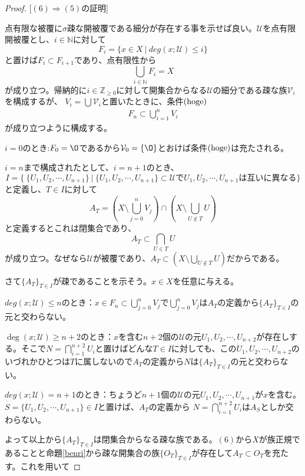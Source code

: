 \documentclass[leqno]{jsarticle}
\newcommand{\To}{\Longrightarrow}
\newcommand{\nn}{\mathbb{N}}
\newcommand{\zz}{\mathbb{Z}}
\newcommand{\dpst}{\displaystyle}
\begin{document}
\begin{proof}
\par[$(3)\To (1)$の証明終わり]\par
[$(6)\To (5)$の証明]\par
点有限な被覆に$\sigma$疎な開被覆である細分が存在する事を示せば良い。$\mathcal{U}$を点有限開被覆とし、$i\in \nn$に対して
\[
F_{i}=\{x\in X\ |\ deg(x;\mathcal{U})\le i\}
\]
と置けば$F_{i}\subset F_{i+1}$であり、点有限性から
\[
\bigcup_{i\in \nn}F_{i}=X
\]
が成り立つ。帰納的に$i\in \zz_{\ge 0}$に対して開集合からなる$\mathcal{U}$の細分である疎な族$\mathcal{V}_{i}$を構成するが、
$V_i=\bigcup\mathcal{V}_i$と置いたときに、条件$({\rm hoge})$
\begin{align}
F_{n}\subset \bigcup_{i=1}^nV_i\tag{hoge}
\end{align}
が成り立つように構成する。\par 
$i=0$のとき:$F_0=\O$であるから$\mathcal{V}_0=\{\O\}$とおけば条件$({\rm hoge})$は充たされる。\par
$i=n$まで構成されたとして、$i=n+1$のとき、
\[
I=\{\ \{U_{1},U_{2},\cdots,U_{n+1}\}\ |\ \mbox{$\{U_{1},U_{2},\cdots,U_{n+1}\}\subset \mathcal{U}$で$U_{1},U_{2},\cdots,U_{n+1}$は互いに異なる}\}
\]
と定義し、$T\in I$に対して
\[
A_{T}=\left(X\setminus \bigcup_{j=0}^nV_j \right)\cap \left(X\setminus \bigcup_{U\not\in T}U\right)
\]
と定義するとこれは閉集合であり、
\[
A_{T}\subset \bigcap_{U\in T}U
\]
が成り立つ。なぜなら$\mathcal{U}$が被覆であり、$\dpst A_T\subset \left(X\setminus \bigcup_{U\not\in T}U\right)$だからである。\par
さて$\{A_T\}_{T\in I}$が疎であることを示そう。$x\in X$を任意に与える。\par 
$deg(x;\mathcal{U})\le n$のとき：$x\in F_n\subset \bigcup_{j=0}^nV_j$で$\bigcup_{j=0}^nV_j$は$A_T$の定義から$\{A_T\}_{T\in I}$の元と交わらない。\par 
$\deg(x;\mathcal{U})\ge n+2$のとき：$x$を含む$n+2$個の$\mathcal{U}$の元$U_1,U_2,\cdots,U_{n+2}$が存在しする。そこで$\dpst N=\bigcap_{i=1}^{n+2}U_{i}$と置けばどんな$T\in I$に対しても、この$U_1,U_2,\cdots,U_{n+2}$のいづれかひとつは$T$に属しないので$A_T$の定義から$N$は$\{A_T\}_{T\in I}$の元と交わらない。\par
$deg(x;\mathcal{U})=n+1$のとき：ちょうど$n+1$個の$\mathcal{U}$の元$U_1,U_2,\cdots,U_{n+1}$が$x$を含む。$S=\{U_1,U_2,\cdots,U_{n+1}\}\in I$と置けば、$A_T$の定義から
$\dpst N=\bigcap_{i=1}^{n+2}U_{i}$は$A_S$としか交わらない。\par 
よって以上から$\{A_T\}_{T\in I}$は閉集合からなる疎な族である。$(6)$から$X$が族正規であることと命題\ref{benri}から疎な開集合の族$\{O_T\}_{T\in I}$が存在して$A_T\subset O_T$を充たす。これを用いて

\end{proof}
\end{document}
